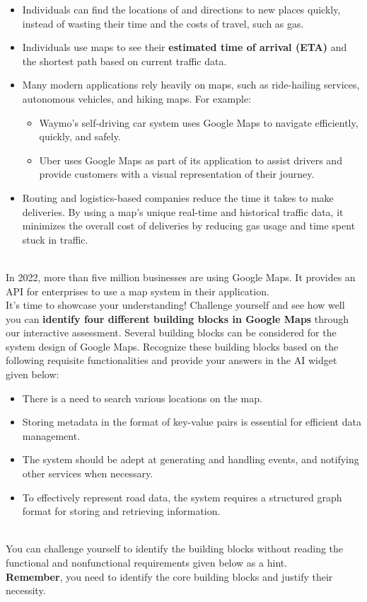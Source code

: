 \begin{itemize}
\item
\protect{}\label{tDw5w_pqKu3jcWGzC8g2K}
Individuals can find the locations of and directions to new places quickly, instead of wasting their time and the costs of travel, such as gas.
\item
\protect{}\label{2V12K0Ksp-Y5rbKH3J0dX}
Individuals use maps to see their \textbf{estimated time of arrival (ETA)} and the shortest path based on current traffic data.
\item
\protect{}\label{VSjM4F1Q9EsW6SfSQs6rn}
Many modern applications rely heavily on maps, such as ride-hailing services, autonomous vehicles, and hiking maps. For example:

\begin{itemize}
\item
Waymo's self-driving car system uses Google Maps to navigate efficiently, quickly, and safely.
\item
Uber uses Google Maps as part of its application to assist drivers and provide customers with a visual representation of their journey.
\end{itemize}
\item
\protect{}\label{fNixoBqWmq7tXqLebAdoc}
Routing and logistics-based companies reduce the time it takes to make deliveries. By using a map's unique real-time and historical traffic data, it minimizes the overall cost of deliveries by reducing gas usage and time spent stuck in traffic.
\end{itemize}
\\
In 2022, more than five million businesses are using Google Maps. It provides an API for enterprises to use a map system in their application.
\\
It's time to showcase your understanding! Challenge yourself and see how well you can \textbf{identify four different building blocks in Google Maps} through our interactive assessment. Several building blocks can be considered for the system design of Google Maps. Recognize these building blocks based on the following requisite functionalities and provide your answers in the AI widget given below:

\begin{itemize}
\item
There is a need to search various locations on the map.
\item
Storing metadata in the format of key-value pairs is essential for efficient data management.
\item
The system should be adept at generating and handling events, and notifying other services when necessary.
\item
To effectively represent road data, the system requires a structured graph format for storing and retrieving information.
\end{itemize}
\\
You can challenge yourself to identify the building blocks without reading the functional and nonfunctional requirements given below as a hint.
\\
\textbf{Remember}, you need to identify the core building blocks and justify their necessity.


